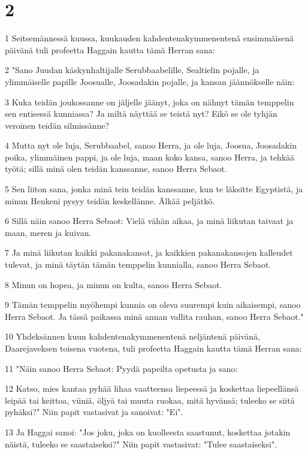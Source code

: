 \chapter{2}

\par 1 Seitsemännessä kuussa, kuukauden kahdentenakymmenentenä ensimmäisenä päivänä tuli profeetta Haggain kautta tämä Herran sana:
\par 2 "Sano Juudan käskynhaltijalle Serubbaabelille, Sealtielin pojalle, ja ylimmäiselle papille Joosualle, Joosadakin pojalle, ja kansan jäännökselle näin:
\par 3 Kuka teidän joukossanne on jäljelle jäänyt, joka on nähnyt tämän temppelin sen entisessä kunniassa? Ja miltä näyttää se teistä nyt? Eikö se ole tyhjän veroinen teidän silmissänne?
\par 4 Mutta nyt ole luja, Serubbaabel, sanoo Herra, ja ole luja, Joosua, Joosadakin poika, ylimmäinen pappi, ja ole luja, maan koko kansa, sanoo Herra, ja tehkää työtä; sillä minä olen teidän kanssanne, sanoo Herra Sebaot.
\par 5 Sen liiton sana, jonka minä tein teidän kanssanne, kun te läksitte Egyptistä, ja minun Henkeni pysyy teidän keskellänne. Älkää peljätkö.
\par 6 Sillä näin sanoo Herra Sebaot: Vielä vähän aikaa, ja minä liikutan taivaat ja maan, meren ja kuivan.
\par 7 Ja minä liikutan kaikki pakanakansat, ja kaikkien pakanakansojen kalleudet tulevat, ja minä täytän tämän temppelin kunnialla, sanoo Herra Sebaot.
\par 8 Minun on hopea, ja minun on kulta, sanoo Herra Sebaot.
\par 9 Tämän temppelin myöhempi kunnia on oleva suurempi kuin aikaisempi, sanoo Herra Sebaot. Ja tässä paikassa minä annan vallita rauhan, sanoo Herra Sebaot."
\par 10 Yhdeksännen kuun kahdentenakymmenentenä neljäntenä päivänä, Daarejaveksen toisena vuotena, tuli profeetta Haggain kautta tämä Herran sana:
\par 11 "Näin sanoo Herra Sebaot: Pyydä papeilta opetusta ja sano:
\par 12 Katso, mies kantaa pyhää lihaa vaatteensa liepeessä ja koskettaa liepeellänsä leipää tai keittoa, viiniä, öljyä tai muuta ruokaa, mitä hyvänsä; tuleeko se siitä pyhäksi?" Niin papit vastasivat ja sanoivat: "Ei".
\par 13 Ja Haggai sanoi: "Jos joku, joka on kuolleesta saastunut, koskettaa jotakin näistä, tuleeko se saastaiseksi?" Niin papit vastasivat: "Tulee saastaiseksi".
